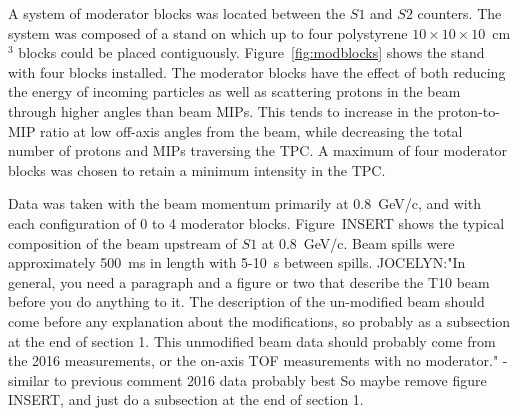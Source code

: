     
    A system of moderator blocks was located between the $S1$ and $S2$ counters.  The system was composed of a stand on which up to four polystyrene $10\times10\times10$~cm$^3$ blocks could be placed contiguously. Figure~\ref{fig:modblocks} shows the stand with four blocks installed. The moderator blocks have the effect of both reducing the energy of incoming particles as well as scattering protons in the beam through higher angles than beam MIPs. This tends to increase in the proton-to-MIP ratio at low off-axis angles from the beam, while decreasing the total number of protons and MIPs traversing the TPC. A maximum of four moderator blocks was chosen to retain a minimum intensity in the TPC.
    
    Data was taken with the beam momentum primarily at 0.8~GeV/c, and with each configuration of 0 to 4 moderator blocks. Figure~INSERT shows the typical composition of the beam upstream of $S1$ at 0.8~GeV/c. Beam spills were approximately 500~ms in length with 5-10~s between spills.  
    JOCELYN:"In general, you need a paragraph and a figure or two that describe the T10 beam before you do anything to it. The description of the un-modified beam should come before any explanation about the modifications, so probably as a subsection at the end of section 1. This unmodified beam data should probably come from the 2016 measurements, or the on-axis TOF measurements with no moderator." - similar to previous comment 2016 data probably best So maybe remove figure INSERT, and just do a subsection at the end of section 1.

    
